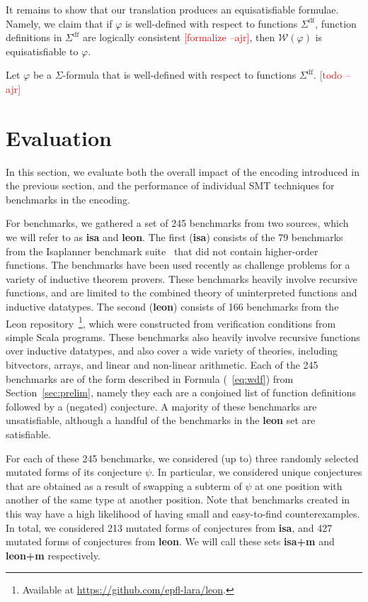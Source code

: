 \documentclass[runningheads,a4paper]{llncs}
\newcommand{\conv}{\mathcal{W}}
\newcommand{\sfundefs}[1]{#1^\mathrm{df}}
\newcommand{\rem}[1]{\textcolor{red}{[#1]}}
\newcommand{\ajr}[1]{\rem{#1 --ajr}}
\begin{document}
It remains to show that our translation produces an equisatisfiable formulae.
Namely,
we claim that if $\varphi$ is well-defined with respect to functions $\sfundefs{\Sigma}$,
function definitions in $\sfundefs{\Sigma}$ are logically consistent \ajr{formalize},
then $\conv(\varphi)$ is equisatisfiable to $\varphi$.

\begin{lemma}
Let $\varphi$ be a $\Sigma$-formula that is well-defined with respect to functions $\sfundefs{\Sigma}$.
\ajr{todo}
\end{lemma}

\section{Evaluation}

In this section, we evaluate both 
the overall impact of the encoding introduced in the previous section, and
the performance of individual SMT techniques for benchmarks in the encoding.

For benchmarks, we gathered a set of 245 benchmarks from two sources, which we will refer to as {\bf isa} and {\bf leon}.
The first ({\bf isa}) consists of the 79 benchmarks from the Isaplanner benchmark suite~\cite{DBLP:conf/itp/JohanssonDB10} that did not contain higher-order functions.
The benchmarks have been used recently as challenge problems for a variety of inductive theorem provers.
These benchmarks heavily involve recursive functions, and are limited to the combined theory of uninterpreted functions and inductive datatypes.
The second ({\bf leon}) consists of 166 benchmarks from the Leon repository~\footnote{Available at \url{https://github.com/epfl-lara/leon}.},
which were constructed from verification conditions from simple Scala programs.
These benchmarks also heavily involve recursive functions over inductive datatypes, 
and also cover a wide variety of theories, including bitvectors, arrays, and linear and non-linear arithmetic.
Each of the 245 benchmarks are of the form described in Formula (~\ref{eq:wdf}) from Section~\ref{sec:prelim},
namely they each are a conjoined list of function definitions followed by a (negated) conjecture.
A majority of these benchmarks are unsatisfiable, although a handful of the benchmarks in the {\bf leon} set are satisfiable.

For each of these 245 benchmarks, we considered (up to) three randomly selected mutated forms of its conjecture $\psi$.
In particular, we considered unique conjectures that are obtained as a result of swapping a subterm of $\psi$ at one position
with another of the same type at another position.
Note that benchmarks created in this way have a high likelihood of having small and easy-to-find counterexamples.
In total, we considered 213 mutated forms of conjectures from {\bf isa}, and 427 mutated forms of conjectures from {\bf leon}.
We will call these sets {\bf isa+m} and {\bf leon+m} respectively.
\end{document}

